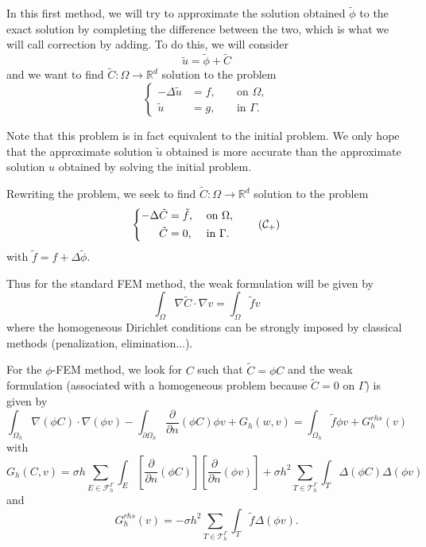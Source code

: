 In this first method, we will try to approximate the solution obtained $\tilde{\phi}$ to the exact solution by completing the difference between the two, which is what we will call correction by adding. To do this, we will consider
\begin{equation*}
	\tilde{u}=\tilde{\phi}+\tilde{C}
\end{equation*}
and we want to find $\tilde{C}: \Omega \rightarrow \mathbb{R}^d$ solution to the problem
\begin{equation*}
	\left\{\begin{aligned}
		-\Delta \tilde{u}&=f, \; &&\text{on } \Omega, \\
		\tilde{u}&=g, \; &&\text{in } \Gamma.
	\end{aligned}\right.
\end{equation*}
\begin{Rem}
	Note that this problem is in fact equivalent to the initial  problem. We only hope that the approximate solution $\tilde{u}$ obtained is more accurate than the approximate solution $u$ obtained by solving the initial problem.
\end{Rem}
Rewriting the problem, we seek to find $\tilde{C}: \Omega \rightarrow \mathbb{R}^d$ solution to the problem
\begin{equation}
\label{eq.corr.pbc_add}
\left\{\begin{aligned}
	-\Delta \tilde{C}&=\tilde{f}, \; &&\text{on } \Omega, \\
	\tilde{C}&=0, \; &&\text{in } \Gamma.
\end{aligned}\right. \tag{$\mathcal{C}_{+}$}
\end{equation}
with $\tilde{f}=f+\Delta\tilde{\phi}$.

Thus for the standard FEM method, the weak formulation will be given by
\begin{equation*}
	\int_\Omega \nabla\tilde{C}\cdot\nabla v=\int_\Omega \tilde{f}v
\end{equation*}
where the homogeneous Dirichlet conditions can be strongly imposed by classical methods (penalization, elimination...).

For the $\phi$-FEM method, we look for $C$ such that $\tilde{C}=\phi C$ and the weak formulation (associated with a homogeneous problem because $\tilde{C}=0$ on $\Gamma$) is given by
\begin{equation*}
	\int_{\Omega_h} \nabla (\phi C) \cdot \nabla (\phi v) - \int_{\partial\Omega_h} \frac{\partial}{\partial n}(\phi C)\phi v+G_h(w,v)=\int_{\Omega_h} \tilde{f} \phi v + G_h^{rhs}(v)
\end{equation*}
with
\begin{equation*}
	G_h(C,v)=\sigma h\sum_{E\in\mathcal{F}_h^\Gamma} \int_E \left[\frac{\partial}{\partial n}(\phi C)\right] \left[\frac{\partial}{\partial n}(\phi v)\right]+\sigma h^2\sum_{T\in\mathcal{T}_h^\Gamma} \int_{T} \Delta(\phi C)\Delta(\phi v)
\end{equation*}
and
\begin{equation*}
	G_h^{rhs}(v)=-\sigma h^2\sum_{T\in\mathcal{T}_h^\Gamma} \int_{T} \tilde{f} \Delta(\phi v).
\end{equation*}

